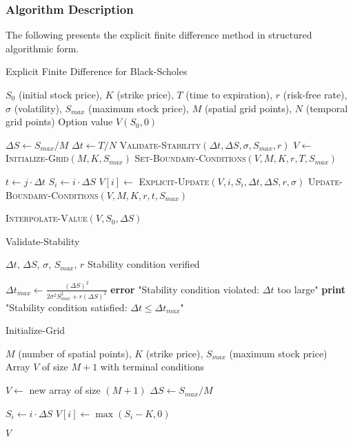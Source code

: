 \documentclass[12pt,a4paper]{article}
\numberwithin{algorithm}{subsection}
\begin{document}
\subsubsection{Algorithm Description}

The following presents the explicit finite difference method in structured algorithmic form.

\begin{algorithm}[H]
\caption{Explicit Finite Difference for Black-Scholes}
\begin{algorithmic}[1]
\REQUIRE $S_0$ (initial stock price), $K$ (strike price), $T$ (time to expiration), $r$ (risk-free rate), $\sigma$ (volatility), $S_{max}$ (maximum stock price), $M$ (spatial grid points), $N$ (temporal grid points)
\ENSURE Option value $V(S_0, 0)$

\STATE $\Delta S \leftarrow S_{max} / M$
\STATE $\Delta t \leftarrow T / N$
\STATE \textsc{Validate-Stability}$(\Delta t, \Delta S, \sigma, S_{max}, r)$
\STATE $V \leftarrow$ \textsc{Initialize-Grid}$(M, K, S_{max})$
\STATE \textsc{Set-Boundary-Conditions}$(V, M, K, r, T, S_{max})$

    \STATE $t \leftarrow j \cdot \Delta t$
        \STATE $S_i \leftarrow i \cdot \Delta S$
        \STATE $V[i] \leftarrow$ \textsc{Explicit-Update}$(V, i, S_i, \Delta t, \Delta S, r, \sigma)$
    \ENDFOR
    \STATE \textsc{Update-Boundary-Conditions}$(V, M, K, r, t, S_{max})$
\ENDFOR

\RETURN \textsc{Interpolate-Value}$(V, S_0, \Delta S)$
\end{algorithmic}
\end{algorithm}

\begin{algorithm}[H]
\caption{Validate-Stability}
\begin{algorithmic}[1]
\REQUIRE $\Delta t$, $\Delta S$, $\sigma$, $S_{max}$, $r$
\ENSURE Stability condition verified

\STATE $\Delta t_{max} \leftarrow \frac{(\Delta S)^2}{2\sigma^2 S_{max}^2 + r(\Delta S)^2}$
    \STATE \textbf{error} "Stability condition violated: $\Delta t$ too large"
\ENDIF
\STATE \textbf{print} "Stability condition satisfied: $\Delta t \leq \Delta t_{max}$"
\end{algorithmic}
\end{algorithm}

\begin{algorithm}[H]
\caption{Initialize-Grid}
\begin{algorithmic}[1]
\REQUIRE $M$ (number of spatial points), $K$ (strike price), $S_{max}$ (maximum stock price)
\ENSURE Array $V$ of size $M+1$ with terminal conditions

\STATE $V \leftarrow$ new array of size $(M+1)$
\STATE $\Delta S \leftarrow S_{max} / M$

    \STATE $S_i \leftarrow i \cdot \Delta S$
    \STATE $V[i] \leftarrow \max(S_i - K, 0)$ 
\ENDFOR

\RETURN $V$
\end{algorithmic}
\end{algorithm}
\end{document}
